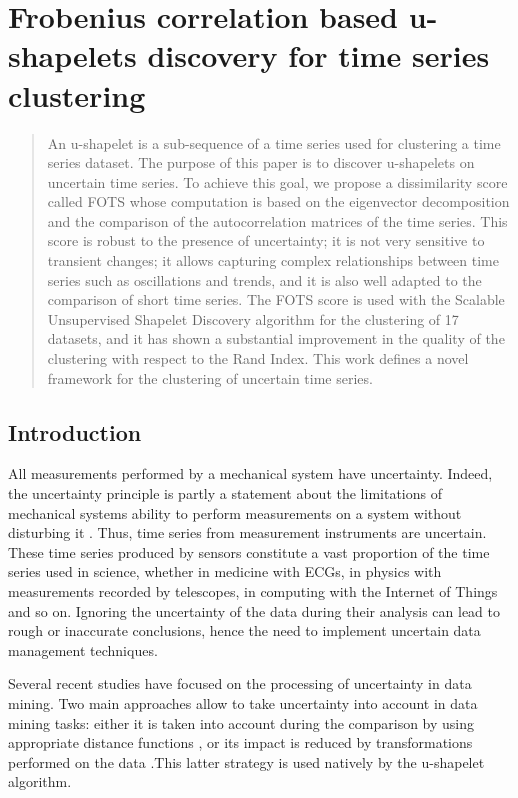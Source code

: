 \chapter[Uncertain time series u-shapelet discovery]{Frobenius correlation based u-shapelets discovery for time series clustering}
\label{fots}

\begin{abstract}
An u-shapelet is a sub-sequence of a time series used for clustering a time series dataset. The purpose of this paper is to discover u-shapelets on uncertain time series. To achieve this goal, we propose a dissimilarity score called FOTS whose computation is based on the eigenvector decomposition and the comparison of the autocorrelation matrices of the time series. This score is robust to the presence of uncertainty; it is not very sensitive to transient changes; it allows capturing complex relationships between time series such as oscillations and trends, and it is also well adapted to the comparison of short time series. The FOTS score is  used with the Scalable Unsupervised Shapelet Discovery algorithm for the clustering of 17 datasets, and it has shown a substantial improvement in the quality of the clustering with respect to the Rand Index. This work defines a novel framework for the clustering of uncertain time series.
\end{abstract}




\section{Introduction}
All measurements performed by a mechanical system have uncertainty. Indeed, the uncertainty principle is partly a statement about the limitations of mechanical systems ability to perform measurements on a system without disturbing it \cite{folland1997uncertainty}. Thus, time series from measurement instruments are uncertain. These time series produced by sensors constitute a vast proportion of the time series used in science, whether in medicine with ECGs, in physics with measurements recorded by telescopes, in computing with the Internet of Things and so on. Ignoring the uncertainty of the data
during their analysis can lead to rough or inaccurate conclusions, hence the need to implement uncertain data management techniques. 



Several recent studies have focused on the processing of uncertainty in data mining. Two main approaches allow to take uncertainty into account in data mining tasks: either it is taken into account during the comparison by using appropriate distance functions \cite{Rizvandi2013, Hwang2014, Rehfeld2014, Orang2014, Wang2015, Orang2017}, or its impact is reduced by transformations performed on the data
\cite{Orang2015}.This latter strategy is used natively by the u-shapelet algorithm.

